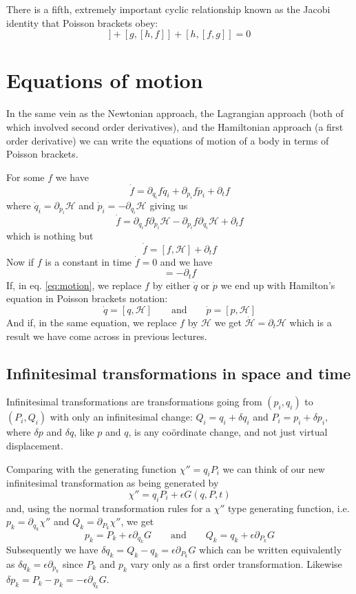 \documentclass[english,seminar,headertitle]{lecture}
\newcommand{\ham}{\mathscr{H}}
\begin{document}
There is a fifth, extremely important cyclic relationship known as the Jacobi identity that Poisson brackets obey:
\begin{equation}
	[f,[g,h]] + [g,[h,f]] + [h,[f,g]] = 0 \label{eq:jacobi-identity}
\end{equation}

\section{Equations of motion}

In the same vein as the Newtonian approach, the Lagrangian approach (both of which involved second order derivatives), and the Hamiltonian approach (a first order derivative) we can write the equations of motion of a body in terms of Poisson brackets.

For some $f$ we have
$$
\dot{f} = \partial_{q_i} f \dot{q_i} + \partial_{p_i} f \dot{p_i} + \partial_t f
$$
where $\dot{q}_i = \partial_{p_i} \ham$ and $\dot{p}_i = - \partial_{q_i} \ham$ giving us
$$
\dot{f} = \partial_{q_i} f \partial_{p_i} \ham - \partial_{p_i} f \partial_{q_i} \ham + \partial_t f
$$
which is nothing but
\begin{equation}
\dot{f} = [f,\ham] + \partial_t f \label{eq:dotted}
\end{equation}%
Now if $f$ is a constant in time $\dot{f} = 0$ and we have
\begin{equation}
	[f,\ham] = -\partial_t f \label{eq:motion}
\end{equation}
If, in eq. \eqref{eq:motion}, we replace $f$ by either $\dot{q}$ or $\dot{p}$ we end up with Hamilton's equation in Poisson brackets notation:
$$
\dot{q} = [q,\ham] \qquad\textrm{and}\qquad \dot{p} = [p,\ham]
$$
And if, in the same equation, we replace $f$ by $\ham$ we get $\dot{\ham} = \partial_t \ham$ which is a result we have come across in previous lectures.

\subsection{Infinitesimal transformations in space and time}

Infinitesimal transformations are transformations going from $(p_i,q_i)$ to $(P_i,Q_i)$ with only an infinitesimal change: $Q_i = q_i + \delta q_i$ and $P_i = p_i + \delta p_i$, where $\delta p$ and $\delta q$, like $p$ and $q$, is any co\"{o}rdinate change, and not just virtual displacement.

Comparing with the generating function $\chi'' = q_iP_i$ we can think of our new infinitesimal transformation as being generated by
$$
\chi'' = q_iP_i + \epsilon G(q,P,t)
$$
and, using the normal transformation rules for a $\chi''$ type generating function, i.e. $p_k = \partial_{q_k} \chi''$ and $Q_k = \partial_{P_k} \chi''$, we get
$$
p_k = P_k + \epsilon \partial_{q_k} G \qquad\textrm{and}\qquad Q_k = q_k + \epsilon \partial_{P_k} G
$$
Subsequently we have $\delta q_k = Q_k - q_k = \epsilon \partial_{P_k} G$ which can be written equivalently as $\delta q_k = \epsilon \partial_{p_k}$ since $P_k$ and $p_k$ vary only as a first order transformation. Likewise $\delta p_k = P_k - p_k = -\epsilon \partial_{q_k} G$.
\end{document}
